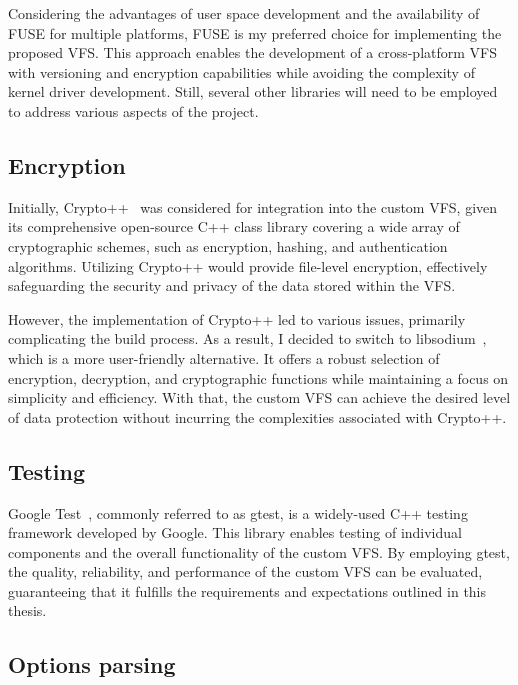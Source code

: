 Considering the advantages of user space development and the availability of FUSE for multiple platforms, FUSE is my preferred choice for implementing the proposed VFS.
This approach enables the development of a cross-platform VFS with versioning and encryption capabilities while avoiding the complexity of kernel driver development.
Still, several other libraries will need to be employed to address various aspects of the project.

\subsection{Encryption}\label{subsec:encryption-analysis}

Initially, Crypto++~\cite{crypto_pp} was considered for integration into the custom VFS, given its comprehensive open-source C++ class library covering a wide array of cryptographic schemes, such as encryption, hashing, and authentication algorithms.
Utilizing Crypto++ would provide file-level encryption, effectively safeguarding the security and privacy of the data stored within the VFS.

However, the implementation of Crypto++ led to various issues, primarily complicating the build process.
As a result, I decided to switch to libsodium~\cite{libsodium}, which is a more user-friendly alternative.
It offers a robust selection of encryption, decryption, and cryptographic functions while maintaining a focus on simplicity and efficiency.
With that, the custom VFS can achieve the desired level of data protection without incurring the complexities associated with Crypto++.

\subsection{Testing}\label{subsec:gtest}

Google Test~\cite{google_test}, commonly referred to as gtest, is a widely-used C++ testing framework developed by Google.
This library enables testing of individual components and the overall functionality of the custom VFS.
By employing gtest, the quality, reliability, and performance of the custom VFS can be evaluated, guaranteeing that it fulfills the requirements and expectations outlined in this thesis.

\subsection{Options parsing}\label{subsec:options-parsing}

